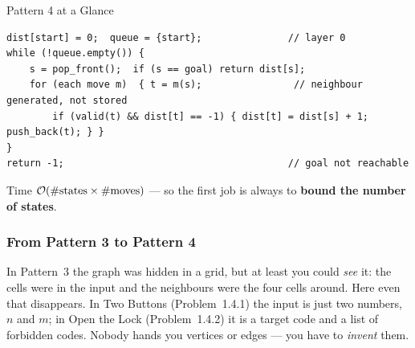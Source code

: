 \begin{patternbox}{Pattern 4 at a Glance}
\begin{lstlisting}[style=snippet]
dist[start] = 0;  queue = {start};               // layer 0
while (!queue.empty()) {
    s = pop_front();  if (s == goal) return dist[s];
    for (each move m)  { t = m(s);                // neighbour generated, not stored
        if (valid(t) && dist[t] == -1) { dist[t] = dist[s] + 1; push_back(t); } }
}
return -1;                                       // goal not reachable
\end{lstlisting}
Time $\mathcal{O}(\#\text{states} \times \#\text{moves})$ --- so the first job is always to \textbf{bound the number of states}.
\end{patternbox}

\subsubsection*{From Pattern 3 to Pattern 4}

In Pattern~3 the graph was hidden in a grid, but at least you could \emph{see} it: the cells were in the input and the neighbours were the four cells around. Here even that disappears. In Two Buttons (Problem~1.4.1) the input is just two numbers, $n$ and $m$; in Open the Lock (Problem~1.4.2) it is a target code and a list of forbidden codes. Nobody hands you vertices or edges --- you have to \emph{invent} them.

